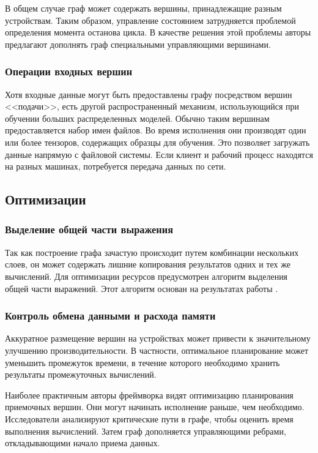 В общем случае граф может содержать вершины, принадлежащие разным устройствам.
Таким образом, управление состоянием затрудняется проблемой определения момента
останова цикла. В качестве решения этой проблемы авторы предлагают дополнять
граф специальными управляющими вершинами.

\subsubsection{Операции входных вершин}

Хотя входные данные могут быть предоставлены графу посредством вершин <<подачи>>,
есть другой распространенный механизм, использующийся при обучении больших
распределенных моделей. Обычно таким вершинам предоставляется набор имен файлов.
Во время исполнения они производят один или более тензоров, содержащих образцы
для обучения. Это позволяет загружать данные напрямую с файловой системы. Если
клиент и рабочий процесс находятся на разных машинах, потребуется передача
данных по сети.

\subsection{Оптимизации}

\subsubsection{Выделение общей части выражения}
Так как построение графа зачастую происходит путем комбинации нескольких слоев,
он может содержать лишние копирования результатов одних и тех же вычислений.
Для оптимизации ресурсов предусмотрен алгоритм выделения общей части выражений.
Этот алгоритм основан на результатах работы \cite{click}.

\subsubsection{Контроль обмена данными и расхода памяти}

Аккуратное размещение вершин на устройствах может привести к значительному
улучшению производительности. В частности, оптимальное планирование может
уменьшить промежуток времени, в течение которого необходимо хранить результаты
промежуточных вычислений.

Наиболее практичным авторы фреймворка видят оптимизацию планирования приемочных
вершин. Они могут начинать исполнение раньше, чем необходимо. Исследователи
анализируют критические пути в графе, чтобы оценить время выполнения вычислений.
Затем граф дополняется управляющими ребрами, откладывающими начало приема данных.

